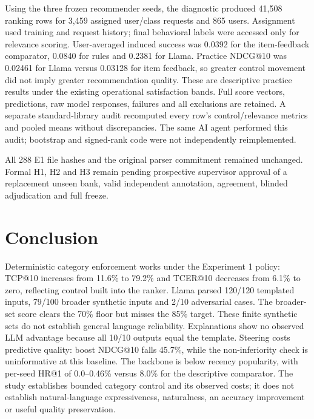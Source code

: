 \documentclass[conference]{IEEEtran}
\begin{document}
Using the three frozen recommender seeds, the diagnostic produced 41,508 ranking rows for 3,459 assigned user/class requests and 865 users. Assignment used training and request history; final behavioral labels were accessed only for relevance scoring. User-averaged induced success was 0.0392 for the item-feedback comparator, 0.0840 for rules and 0.2381 for Llama. Practice NDCG@10 was 0.02461 for Llama versus 0.03128 for item feedback, so greater control movement did not imply greater recommendation quality. These are descriptive practice results under the existing operational satisfaction bands. Full score vectors, predictions, raw model responses, failures and all exclusions are retained. A separate standard-library audit recomputed every row's control/relevance metrics and pooled means without discrepancies. The same AI agent performed this audit; bootstrap and signed-rank code were not independently reimplemented.

All 288 E1 file hashes and the original parser commitment remained unchanged. Formal H1, H2 and H3 remain pending prospective supervisor approval of a replacement unseen bank, valid independent annotation, agreement, blinded adjudication and full freeze.

\section{Conclusion}
Deterministic category enforcement works under the Experiment 1 policy: TCP@10 increases from 11.6\% to 79.2\% and TCER@10 decreases from 6.1\% to zero, reflecting control built into the ranker. Llama parsed 120/120 templated inputs, 79/100 broader synthetic inputs and 2/10 adversarial cases. The broader-set score clears the 70\% floor but misses the 85\% target. These finite synthetic sets do not establish general language reliability. Explanations show no observed LLM advantage because all 10/10 outputs equal the template. Steering costs predictive quality: boost NDCG@10 falls 45.7\%, while the non-inferiority check is uninformative at this baseline. The backbone is below recency popularity, with per-seed HR@1 of 0.0--0.46\% versus 8.0\% for the descriptive comparator. The study establishes bounded category control and its observed costs; it does not establish natural-language expressiveness, naturalness, an accuracy improvement or useful quality preservation.



\end{document}
